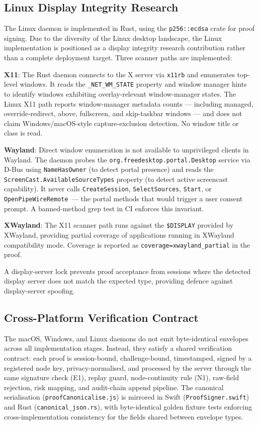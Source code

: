 \documentclass[conference]{IEEEtran}
\begin{document}
\subsection{Linux Display Integrity Research}

The Linux daemon is implemented in Rust, using the \texttt{p256::ecdsa} crate for proof signing. Due to the diversity of the Linux desktop landscape, the Linux implementation is positioned as a display integrity research contribution rather than a complete deployment target. Three scanner paths are implemented:

\textbf{X11}: The Rust daemon connects to the X server via \texttt{x11rb} and enumerates top-level windows. It reads the \texttt{\_NET\_WM\_STATE} property and window manager hints to identify windows exhibiting overlay-relevant window-manager states. The Linux X11 path reports window-manager metadata counts — including managed, override-redirect, above, fullscreen, and skip-taskbar windows — and does not claim Windows/macOS-style capture-exclusion detection. No window title or class is read.

\textbf{Wayland}: Direct window enumeration is not available to unprivileged clients in Wayland. The daemon probes the \texttt{org.freedesktop.portal.Desktop} service via D-Bus using \texttt{NameHasOwner} (to detect portal presence) and reads the \texttt{ScreenCast.AvailableSourceTypes} property (to detect active screencast capability). It never calls \texttt{CreateSession}, \texttt{SelectSources}, \texttt{Start}, or \texttt{OpenPipeWireRemote}~--- the portal methods that would trigger a user consent prompt. A banned-method grep test in CI enforces this invariant.

\textbf{XWayland}: The X11 scanner path runs against the \texttt{\$DISPLAY} provided by XWayland, providing partial coverage of applications running in XWayland compatibility mode. Coverage is reported as \texttt{coverage=xwayland\_partial} in the proof.

A display-server lock prevents proof acceptance from sessions where the detected display server does not match the expected type, providing defence against display-server spoofing.

\subsection{Cross-Platform Verification Contract}

The macOS, Windows, and Linux daemons do not emit byte-identical envelopes across all implementation stages. Instead, they satisfy a shared verification contract: each proof is session-bound, challenge-bound, timestamped, signed by a registered node key, privacy-normalised, and processed by the server through the same signature check (E1), replay guard, node-continuity rule (N1), raw-field rejection, risk mapping, and audit-chain append pipeline. The canonical serialisation (\texttt{proofCanonicalise.js}) is mirrored in Swift (\texttt{ProofSigner.swift}) and Rust (\texttt{canonical\_json.rs}), with byte-identical golden fixture tests enforcing cross-implementation consistency for the fields shared between envelope types.
\end{document}
